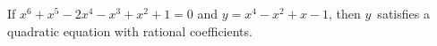 If $x^{6} + x^{5} - 2x^{4} - x^{3} + x^{2} + 1 = 0$ and $y = x^{4} - x^{2} + x - 1$, then $y$~satisfies
a quadratic equation with rational coefficients. 

